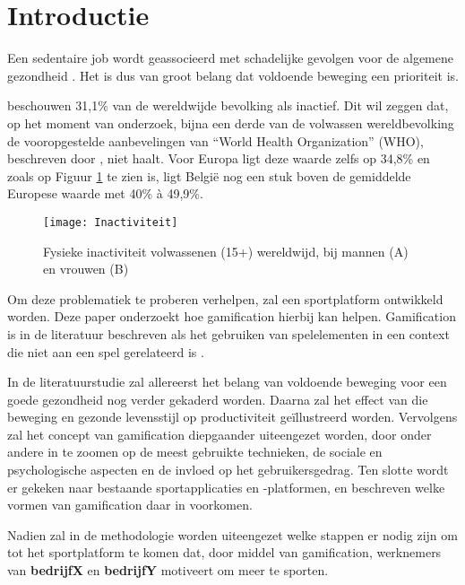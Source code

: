 
\section{Introductie}%
\label{sec:introductie}

Een sedentaire job wordt geassocieerd met schadelijke gevolgen voor de algemene gezondheid \autocite{Buckley2015}. Het is dus van groot belang dat voldoende beweging een prioriteit is.

\textcite{Hallal2012} beschouwen 31,1\% van de wereldwijde bevolking als inactief. Dit wil zeggen dat, op het moment van onderzoek, bijna een derde van de volwassen wereldbevolking de vooropgestelde aanbevelingen van ``World Health \linebreak Organization'' (WHO), beschreven door \textcite{Bull2020}, niet haalt. Voor Europa ligt deze waarde zelfs op 34,8\% en zoals op Figuur \ref{fig:inactivity} te zien is, ligt België nog een stuk boven de gemiddelde Europese waarde met 40\% à 49,9\%.

\begin{figure}[t]
    \caption{Fysieke inactiviteit volwassenen (15+) wereldwijd, bij mannen (A) en vrouwen (B) \autocite{Bull2020}}
    \texttt{[image: Inactiviteit]}
    \label{fig:inactivity}
\end{figure}

Om deze problematiek te proberen verhelpen, zal een sportplatform ontwikkeld worden. Deze paper onderzoekt hoe gamification hierbij kan helpen. Gamification is in de literatuur beschreven als het gebruiken van spelelementen in een context die niet aan een spel gerelateerd is \autocite{Gaalen2020}.

In de literatuurstudie zal allereerst het belang van voldoende beweging voor een goede gezondheid nog verder gekaderd worden. Daarna zal het effect van die beweging en gezonde levensstijl op productiviteit geïllustreerd worden. Vervolgens zal het concept van gamification diepgaander uiteengezet worden, door onder andere in te zoomen op de meest gebruikte technieken, de sociale en psychologische aspecten en de invloed op het gebruikersgedrag. Ten slotte wordt er gekeken naar bestaande sportapplicaties en -platformen, en beschreven welke vormen van gamification daar in voorkomen.

Nadien zal in de methodologie worden uiteengezet welke stappen er nodig zijn om tot het sportplatform te komen dat, door middel van gamification, werknemers van \textbf{bedrijfX} en \textbf{bedrijfY} motiveert om meer te sporten.

